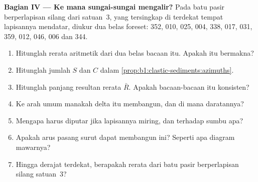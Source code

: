 \begin{problem}
\medskip
\noindent\textbf{Bagian IV --- Ke mana sungai-sungai mengalir?}
Pada batu pasir berperlapisan silang dari satuan~3, yang tersingkap di  terdekat tempat lapisannya mendatar, diukur dua belas  foreset: 352, 010, 025, 004, 338, 017, 031, 359, 012, 046, 006 dan 344.
\begin{enumerate}[resume]
  \item Hitunglah rerata aritmetik dari dua belas bacaan itu. Apakah itu bermakna?
  \item Hitunglah jumlah $S$ dan $C$ dalam \cref{prop:b1:clastic-sediments:azimuths}.
  \item Hitunglah panjang resultan rerata $\bar R$. Apakah bacaan-bacaan itu konsisten?
  \item Ke arah umum manakah delta itu membangun, dan di mana daratannya?
  \item Mengapa  harus diputar jika lapisannya miring, dan terhadap sumbu apa?
  \item Apakah arus pasang surut dapat membangun  ini? Seperti apa diagram mawarnya?
  \item Hingga derajat terdekat, berapakah   rerata dari batu pasir berperlapisan silang satuan~3?
\end{enumerate}
\end{problem}
